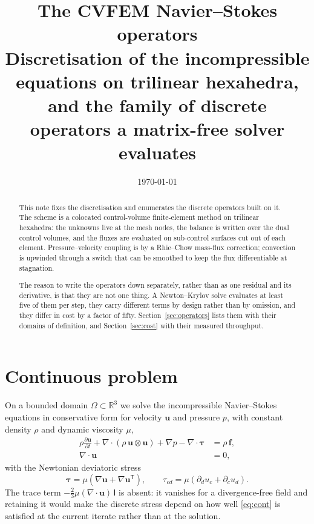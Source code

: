\documentclass[11pt,a4paper]{article}
\title{\bfseries The CVFEM Navier--Stokes operators\\
\large Discretisation of the incompressible equations on trilinear hexahedra,\\
and the family of discrete operators a matrix-free solver evaluates}
\date{\today}
\newcommand{\bu}{\mathbf{u}}
\newcommand{\bff}{\mathbf{f}}
\newcommand{\bI}{\mathsf{I}}
\newcommand{\bttau}{\boldsymbol{\tau}}
\begin{document}
\maketitle

\begin{abstract}
\noindent
This note fixes the discretisation and enumerates the discrete operators built on it. The
scheme is a colocated control-volume finite-element method on trilinear hexahedra: the
unknowns live at the mesh nodes, the balance is written over the dual control volumes, and
the fluxes are evaluated on sub-control surfaces cut out of each element. Pressure--velocity
coupling is by a Rhie--Chow mass-flux correction; convection is upwinded through a switch
that can be smoothed to keep the flux differentiable at stagnation.

The reason to write the operators down separately, rather than as one residual and its
derivative, is that they are not one thing. A Newton--Krylov solve evaluates at least five
of them per step, they carry different terms by design rather than by omission, and they
differ in cost by a factor of fifty. Section~\ref{sec:operators} lists them with their
domains of definition, and Section~\ref{sec:cost} with their measured throughput.
\end{abstract}

\section{Continuous problem}

On a bounded domain $\Omega \subset \mathbb{R}^3$ we solve the incompressible Navier--Stokes
equations in conservative form for velocity $\bu$ and pressure $p$, with constant density
$\rho$ and dynamic viscosity $\mu$,
\begin{align}
  \rho \frac{\partial \bu}{\partial t}
  + \nabla \cdot \left( \rho\, \bu \otimes \bu \right)
  + \nabla p - \nabla \cdot \bttau &= \rho\, \bff , \label{eq:mom} \\[2pt]
  \nabla \cdot \bu &= 0 , \label{eq:cont}
\end{align}
with the Newtonian deviatoric stress
\begin{equation}
  \bttau = \mu \left( \nabla \bu + \nabla \bu^{\mathsf T} \right) ,
  \qquad \tau_{cd} = \mu \left( \partial_d u_c + \partial_c u_d \right) .
  \label{eq:stress}
\end{equation}
The trace term $-\tfrac23 \mu (\nabla\cdot\bu)\,\bI$ is absent: it vanishes for a
divergence-free field and retaining it would make the discrete stress depend on how well
\eqref{eq:cont} is satisfied at the current iterate rather than at the solution.
\end{document}
